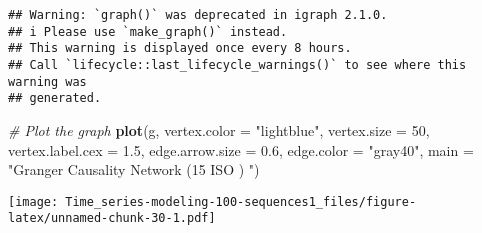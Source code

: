 \documentclass[
]{article}
\newenvironment{Shaded}{\begin{snugshade}}{\end{snugshade}}
\newcommand{\AttributeTok}[1]{\textcolor[rgb]{0.13,0.29,0.53}{#1}}
\newcommand{\CommentTok}[1]{\textcolor[rgb]{0.56,0.35,0.01}{\textit{#1}}}
\newcommand{\DecValTok}[1]{\textcolor[rgb]{0.00,0.00,0.81}{#1}}
\newcommand{\FloatTok}[1]{\textcolor[rgb]{0.00,0.00,0.81}{#1}}
\newcommand{\FunctionTok}[1]{\textcolor[rgb]{0.13,0.29,0.53}{\textbf{#1}}}
\newcommand{\NormalTok}[1]{#1}
\newcommand{\StringTok}[1]{\textcolor[rgb]{0.31,0.60,0.02}{#1}}
\begin{document}
\begin{verbatim}
## Warning: `graph()` was deprecated in igraph 2.1.0.
## i Please use `make_graph()` instead.
## This warning is displayed once every 8 hours.
## Call `lifecycle::last_lifecycle_warnings()` to see where this warning was
## generated.
\end{verbatim}

\begin{Shaded}
\begin{Highlighting}[]
\CommentTok{\# Plot the graph}
\FunctionTok{plot}\NormalTok{(g,}
     \AttributeTok{vertex.color =} \StringTok{"lightblue"}\NormalTok{,}
     \AttributeTok{vertex.size =} \DecValTok{50}\NormalTok{,}
     \AttributeTok{vertex.label.cex =} \FloatTok{1.5}\NormalTok{,}
     \AttributeTok{edge.arrow.size =} \FloatTok{0.6}\NormalTok{,}
     \AttributeTok{edge.color =} \StringTok{"gray40"}\NormalTok{,}
     \AttributeTok{main =} \StringTok{"Granger Causality Network (15 ISO ) "}\NormalTok{)}
\end{Highlighting}
\end{Shaded}

\texttt{[image: Time\_series-modeling-100-sequences1\_files/figure-latex/unnamed-chunk-30-1.pdf]}
\end{document}
